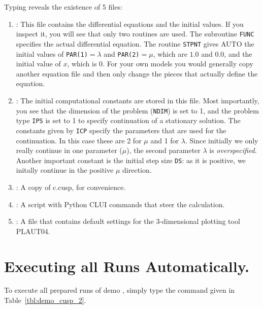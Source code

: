 \documentclass[12pt]{report}
\begin{document}
Typing  reveals the existence of 5 files:
\begin{enumerate}
\item
{}: This file contains the differential equations
and the initial values. If you inspect it, you will see that only two
routines are used. The subroutine {\tt FUNC} specifies the actual
differential equation. The routine {\tt STPNT} gives {\cal AUTO}
the initial values of {\tt PAR(1)}$=\lambda$ and
{\tt PAR(2)}$=\mu$, which
are $1.0$ and $0.0$, and the initial value of $x$, which is $0$.
For your own models you would generally copy another equation file
and then only change the pieces that actually define the equation.

\item
{}: The initial computational constants are stored
in this file. Most importantly, you see that the dimension of the
problem ({\tt NDIM}) is set to 1, and the problem type {\tt IPS}
is set to 1 to specify continuation of a stationary solution.
The constants given by {\tt ICP} specify the parameters that are
used for the continuation. In this case these are 2 for $\mu$ and
1 for $\lambda$.
Since initially we only really continue in one parameter ($\mu$),
the second parameter $\lambda$ is \emph{overspecified}.
Another important constant is the initial step size {\tt DS}: as it is
positive, we initally continue in the positive $\mu$ direction.

\item
{}: A copy of c.cusp, for convenience.

\item
{}: A script with Python CLUI commands that steer
the calculation.

\item
{}: A file that contains default settings for
the 3-dimensional plotting tool PLAUT04.

\end{enumerate}

\section{ Executing all Runs Automatically.} \label{sec:Tutorial_all_runs}
To execute all prepared runs of demo ,
simply type the command given in Table~\ref{tbl:demo_cusp_2}.
\end{document}
